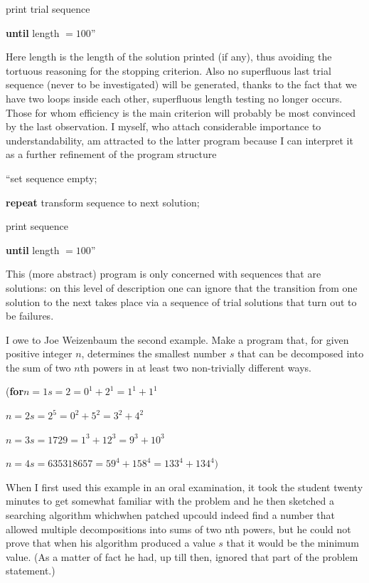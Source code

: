 \documentclass[twoside,11pt]{book}
\begin{document}
\quad \quad print trial sequence

\quad \textbf{until} length $= 100$''

Here length is the length of the solution printed (if any), thus avoiding the tortuous reasoning for the stopping criterion. Also no superfluous last trial sequence (never to be investigated) will be generated, thanks to the fact that we have two loops inside each other, superfluous length testing no longer occurs. Those for whom efficiency is the main criterion will probably be most convinced by the last observation. I myself, who attach considerable importance to understandability, am attracted to the latter program because I can interpret it as a further refinement of the program structure

\quad \hspace{-.4em}``set sequence empty;

\quad \textbf{repeat} transform sequence to next solution;

\quad \quad print sequence

\quad \textbf{until} length $= 100$''

This (more abstract) program is only concerned with sequences that are solutions: on this level of description one can ignore that the transition from one solution to the next takes place via a sequence of trial solutions that turn out to be failures.

I owe to Joe Weizenbaum the second example. Make a program that, for given positive integer $n$, determines the smallest number $s$ that can be decomposed into the sum of two $n$th powers in at least two non-trivially different ways.

\noindent
(\textbf{for}\tabto{2em}$n = 1$\tabto{6em}$s = 2 = 0^1 + 2^1 = 1^1 + 1^1$

\tabto{2em}$n = 2$\tabto{6em}$s = 2^5 = 0^2 + 5^2 = 3^2 + 4^2$

\tabto{2em}$n=3$\tabto{6em}$s=1729=1^3 +12^3 =9^3 +10^3$

\tabto{2em}$n = 4$\tabto{6em}$s = 635318657 = 59^4 + 158^4 = 133^4 + 134^4)$

When I first used this example in an oral examination, it took the student twenty minutes to get somewhat familiar with the problem and he then sketched a searching algorithm which\textemdash{}when patched up\textemdash{}could indeed find a number that allowed multiple decompositions into sums of two nth powers, but he could not prove that when his algorithm produced a value $s$ that it would be the minimum value. (As a matter of fact he had, up till then, ignored that part of the problem statement.)
\end{document}
